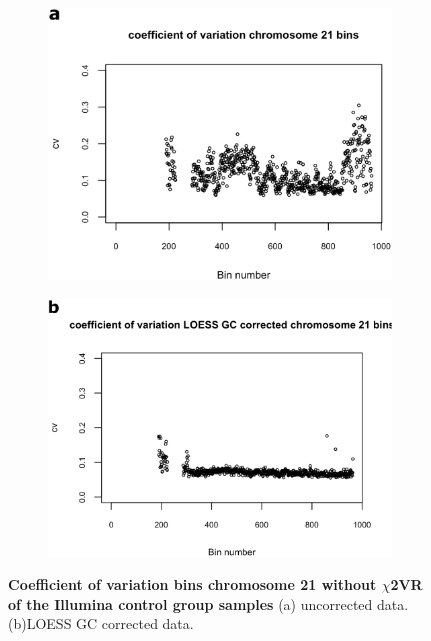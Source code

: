 \begin{figure}[!hb]
	\begin{subfigure}{.5\textwidth}
		\centering
		\includegraphics[width=1\linewidth]{img/NIPT_Supp1_Fig1_2a}
		\label{fig:NIPT_Supp1_Fig1_2a}
	\end{subfigure}%
	\begin{subfigure}{.5\textwidth}
		\centering
		\includegraphics[width=1\linewidth]{img/NIPT_Supp1_Fig1_2b}
		\label{fig:NIPT_Supp1_Fig1_2b}
	\end{subfigure} 
	\caption[Example CV per bin with and without $\chi$2VR]{\textbf{Coefficient of variation bins chromosome 21 without $\chi$2VR of the Illumina control group samples} (a) uncorrected data. (b)LOESS GC corrected data.}
	\label{fig:NIPT_Supp1_Fig1_2}
\end{figure}

